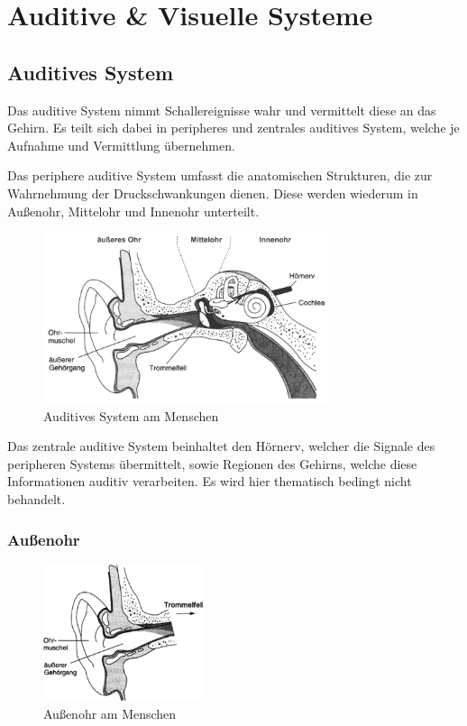 \section{Auditive \& Visuelle Systeme}
\subsection{Auditives System}
Das auditive System nimmt Schallereignisse wahr und vermittelt diese an das Gehirn. Es teilt sich dabei in peripheres und zentrales auditives System, welche je Aufnahme und Vermittlung übernehmen.

Das periphere auditive System umfasst die anatomischen Strukturen, die zur Wahrnehmung der Druckschwankungen dienen. Diese werden wiederum in Außenohr, Mittelohr und Innenohr unterteilt.

\begin{figure}[H]
	\centering
	\includegraphics[height=5cm]{images/auditive-system.png}
	\caption{Auditives System am Menschen \cite{netaudio:as}}
	\label{fig:as}
\end{figure}

Das zentrale auditive System beinhaltet den Hörnerv, welcher die Signale des peripheren Systems übermittelt, sowie Regionen des Gehirns, welche diese Informationen auditiv verarbeiten. Es wird hier thematisch bedingt nicht behandelt.

\subsubsection{Außenohr}
\begin{figure}
 	\centering
 	\includegraphics[height=4cm]{images/aussenohr.png}
	\caption{Außenohr am Menschen \cite{netaudio:aussenohr}}
	\label{fig:aussenohr}
\end{figure}

